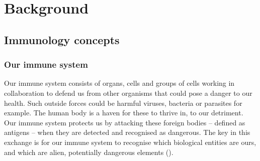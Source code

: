 
\chapter{Background}

\section{Immunology concepts}

\subsection{Our immune system} \label{bg:immunesystem}

Our immune system consists of organs, cells and groups of cells working in collaboration to defend us from other organisms that could pose a danger to our health. Such outside forces could be harmful viruses, bacteria or parasites for example. The human body is a haven for these to thrive in, to our detriment. Our immune system protects us by attacking these foreign bodies – defined as antigens – when they are detected and recognised as dangerous. The key in this exchange is for our immune system to recognise which biological entities are ours, and which are alien, potentially dangerous elements (\cite{http://www.imgt.org/IMGTeducation/Tutorials/ImmuneSystem/UK/the_immune_system.pdf}).

